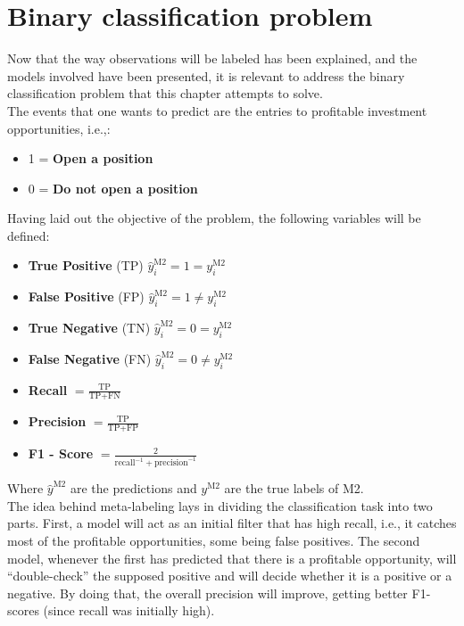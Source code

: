 \documentclass[a4paper]{article}
\begin{document}
\section{Binary classification problem}
Now that the way observations will be labeled has been explained, and 
the models involved have been presented, it is relevant to address the 
binary classification problem that this chapter attempts to solve.\\

The events that one wants to predict are the entries to profitable 
investment opportunities, i.e.,:

\begin{itemize}
	\item 1 = \textbf{Open a position}
	\item 0 = \textbf{Do not open a position}
\end{itemize}


Having laid out the objective of the problem, the following variables 
will be defined:

\begin{itemize}
	\item \textbf{True Positive} (TP) 
	$\hat{y}^{\text{M2}}_i = 1 = y^{\text{M2}}_i$
		
	\item \textbf{False Positive} (FP) 
	$\hat{y}^{\text{M2}}_i = 1 \neq y^{\text{M2}}_i$
	
	\item \textbf{True Negative} (TN) 
	$\hat{y}^{\text{M2}}_i = 0 = y^{\text{M2}}_i$
	
	\item \textbf{False Negative} (FN) 
	$\hat{y}^{\text{M2}}_i = 0 \neq y^{\text{M2}}_i$
	
	\item \textbf{Recall} $ = \frac{\text{TP}}{\text{TP} + \text{FN}}$
	
	\item \textbf{Precision} 
	$ = \frac{\text{TP}}{\text{TP} + \text{FP}}$
	
	\item \textbf{F1 - Score} 
	$ = \frac{2}{\text{recall}^{-1} + \text{precision}^{-1}}$
\end{itemize}

Where $\hat{y}^{\text{M2}}$ are the predictions and $y^{\text{M2}}$ 
are the true labels of M2.\\

The idea behind meta-labeling lays in dividing the classification task 
into two parts. First, a model will act as an initial filter that has 
high recall, i.e., it catches most of the profitable opportunities, 
some being false positives. The second model, whenever the first has 
predicted that there is a profitable opportunity, will 
``double-check'' the supposed positive and will decide whether it is 
a positive or a negative. By doing that, the overall precision will 
improve, getting better F1-scores (since recall was initially high).
\end{document}
